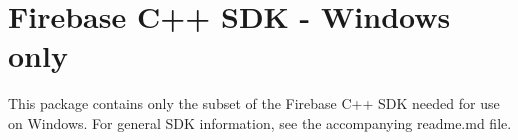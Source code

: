 \chapter{Firebase C++ SDK -\/ Windows only}
\hypertarget{md_build_2windows_2x64_2extracted_2firebase__cpp__sdk__windows_2readme__windows}{}\label{md_build_2windows_2x64_2extracted_2firebase__cpp__sdk__windows_2readme__windows}
\label{md_build_2windows_2x64_2extracted_2firebase__cpp__sdk__windows_2readme__windows_autotoc_md137}%
%


This package contains only the subset of the Firebase C++ SDK needed for use on Windows. For general SDK information, see the accompanying readme.\+md file. 